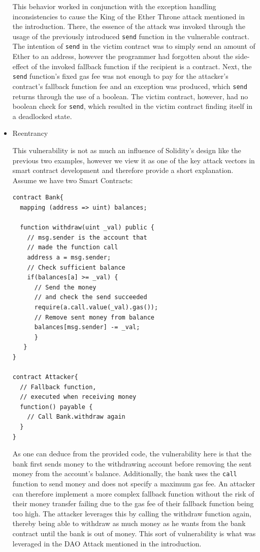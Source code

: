 \documentclass[letterpaper,twocolumn,10pt]{article}
\begin{document}
\begin{itemize}
  This behavior worked in conjunction with the exception handling inconsistencies to cause the King of the Ether Throne attack mentioned in the introduction. There, the essence of the attack was invoked through the usage of the previously introduced \verb|send| function in the vulnerable contract. The intention of \verb|send| in the victim contract was to simply send an amount of Ether to an address, however the programmer had forgotten about the side-effect of the invoked fallback function if the recipient is a contract. Next, the \verb|send| function's fixed gas fee was not enough to pay for the attacker's contract's fallback function fee and an exception was produced, which \verb|send| returns through the use of a boolean. The victim contract, however, had no boolean check for \verb|send|, which resulted in the victim contract finding itself in a deadlocked state.
  
    \item Reentrancy
    
    
    This vulnerability is not as much an influence of Solidity's design like the previous two examples, however we view it as one of the key attack vectors in smart contract development and therefore provide a short explanation. Assume we have two Smart Contracts:
    
  \begin{verbatim}
contract Bank{  
  mapping (address => uint) balances;

  function withdraw(uint _val) public {
    // msg.sender is the account that  
    // made the function call
    address a = msg.sender;
    // Check sufficient balance
    if(balances[a] >= _val) {
      // Send the money 
      // and check the send succeeded
      require(a.call.value(_val).gas());
      // Remove sent money from balance
      balances[msg.sender] -= _val;
      }
   }
}  

contract Attacker{
  // Fallback function,
  // executed when receiving money
  function() payable { 
    // Call Bank.withdraw again    
  }
}
  \end{verbatim}
  
As one can deduce from the provided code, the vulnerability here is that the bank first sends money to the withdrawing account before removing the sent money from the account's balance. Additionally, the bank uses the \verb|call| function to send money and does not specify a maximum gas fee. An attacker can therefore implement a more complex fallback function without the risk of their money transfer failing due to the gas fee of their fallback function being too high. The attacker leverages this by calling the withdraw function again, thereby being able to withdraw as much money as he wants from the bank contract until the bank is out of money. This sort of vulnerability is what was leveraged in the DAO Attack mentioned in the introduction. 


\end{itemize}
\end{document}
